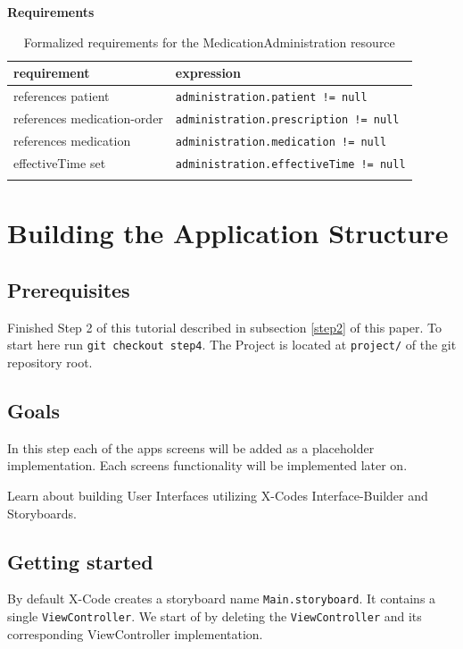 \documentclass{article}
\begin{document}
\textbf{Requirements}\label{res:medicationadministration:requirements}
\begin{longtable}[H]{@{}ll@{}}
  \toprule
    requirement &
    expression
  \\
  \midrule
    references patient &
    \texttt{administration.patient\ !=\ null}
  \\
    references medication-order &
    \texttt{administration.prescription\ !=\ null}
  \\
    references medication &
    \texttt{administration.medication\ !=\ null}
  \\
    effectiveTime set &
    \texttt{administration.effectiveTime\ !=\ null}
  \\
  \bottomrule
\caption{Formalized requirements for the MedicationAdministration resource}
\end{longtable}

\section{Building the Application
Structure}\label{step4}

\subsection{Prerequisites}\label{step4:prerequisites}
Finished Step 2 of this tutorial described in subsection \ref{step2} of this paper.
To start here run \texttt{git checkout step4}.
The Project is located at \texttt{project/} of the git repository root.

\subsection{Goals}\label{step4:goals}
In this step each of the apps screens will be added as a placeholder
implementation. Each screens functionality will be implemented later on.

Learn about building User Interfaces utilizing X-Codes Interface-Builder
and Storyboards.

\subsection{Getting started}\label{step4:getting-started}
By default X-Code creates a storyboard name \texttt{Main.storyboard}.
It contains a single \texttt{ViewController}.
We start of by deleting the \texttt{ViewController} and its
corresponding ViewController implementation.
\end{document}
